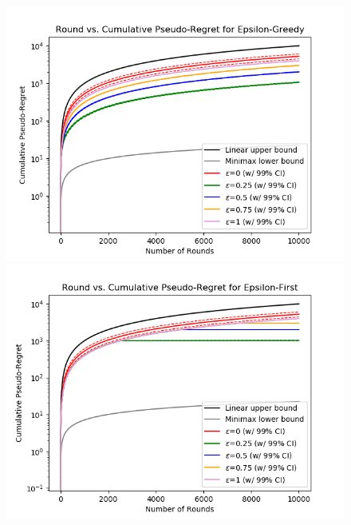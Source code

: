 \documentclass[12pt]{article}
\begin{document}
\begin{figure}[H]
\begin{minipage}[h]{0.5\linewidth}
\includegraphics[width=\linewidth, height=0.75\linewidth]{epsilon-greedy.png}
\end{minipage}
\begin{minipage}[h]{0.5\linewidth}
\includegraphics[width=\linewidth, height=0.75\linewidth]{epsilon-first.png}
\end{minipage}
\begin{minipage}[h]{0.5\linewidth}

\end{minipage}
\end{figure}
\end{document}
